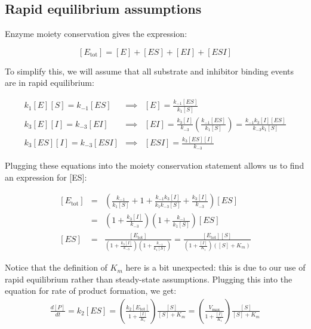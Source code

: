 \documentclass{article}
\begin{document}
\subsection*{Rapid equilibrium assumptions}

Enzyme moiety conservation gives the expression:

\[ \left[ E_{\textrm{tot}} \right] = \left[ E \right] + \left[ ES \right] + \left[ EI \right] + \left[ ESI \right] \]

To simplify this, we will assume that all substrate and inhibitor binding events are in rapid equilibrium:

\begin{eqnarray*}
k_1 \left[ E \right] \left[ S \right] = k_{-1} \left[ ES \right] & \implies & \left[ E \right]  = \frac{k_{-1} \left[ ES \right]}{k_1 \left[ S \right]}\\
k_3 \left[ E \right] \left[ I \right] = k_{-3} \left[ EI \right] & \implies & \left[ EI \right]  = \frac{k_3 \left[ I \right]}{k_{-3}} \left( \frac{k_{-1} \left[ ES \right]}{k_1 \left[ S \right]} \right) = \frac{k_{-1}k_3 \left[ I \right] \left[ ES \right]}{k_{-3}k_1 \left[ S \right]}\\
k_3 \left[ ES \right] \left[ I \right] = k_{-3} \left[ ESI \right] & \implies & \left[ ESI \right] = \frac{k_3 \left[ ES \right] \left[ I \right]}{k_{-3}}
\end{eqnarray*}

Plugging these equations into the moiety conservation statement allows us to find an expression for [ES]:

\begin{eqnarray*}
\left[ E_{\textrm{tot}} \right] & = & \left( \frac{k_{-1}}{k_1 \left[ S \right]} + 1 + \frac{k_{-1}k_3 \left[ I \right]}{k_1 k_{-3} \left[ S \right]} + \frac{k_3 \left[ I \right]}{k_{-3}}  \right) \left[ ES \right]\\
& = & \left( 1 + \frac{k_3 \left[ I \right]}{k_{-3}} \right)\left( 1 + \frac{k_{-1}}{k_{1}\left[ S \right]} \right) \left[ ES \right]\\
\left[ ES \right] & = & \frac{\left[ E_{\textrm{tot}} \right]}{\left( 1 + \frac{k_3 \left[ I \right]}{k_{-3}} \right)\left( 1 + \frac{k_{-1}}{k_{1}\left[ S \right]} \right)} = \frac{\left[ E_{\textrm{tot}} \right] \left[ S \right]}{\left( 1 + \frac{\left[ I \right]}{K_i} \right)\left( \left[ S \right] + K_m\right)}
\end{eqnarray*}

Notice that the definition of $K_m$ here is a bit unexpected: this is due to our use of rapid equilibrium rather than steady-state assumptions. Plugging this into the equation for rate of product formation, we get:
\begin{eqnarray*}
\frac{d \left[ P \right]}{dt} = k_2 \left[ ES \right] = \left( \frac{k_2 \left[ E_{\textrm{tot}} \right]}{1 + \frac{\left[ I \right]}{K_i}} \right) \frac{\left[S\right]}{\left[ S \right] + K_m} = \left( \frac{V_{\textrm{max}}}{1 + \frac{\left[ I \right]}{K_i}} \right) \frac{\left[S\right]}{\left[ S \right] + K_m}
\end{eqnarray*}
\end{document}
